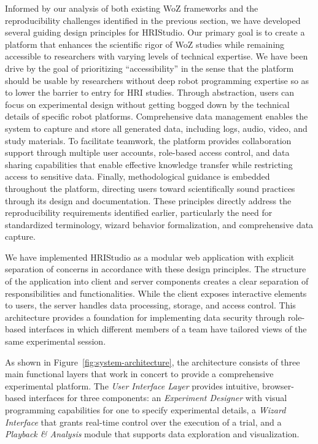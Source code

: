 \documentclass[letterpaper, 10 pt, conference]{subfiles/ieeeconf}
\begin{document}
Informed by our analysis of both existing WoZ frameworks and the reproducibility challenges identified in the previous section, we have developed several guiding design principles for HRIStudio. Our primary goal is to create a platform that enhances the scientific rigor of WoZ studies while remaining accessible to researchers with varying levels of technical expertise. We have been drive by the goal of prioritizing ``accessibility'' in the sense that the platform should be usable by researchers without deep robot programming expertise so as to lower the barrier to entry for HRI studies. Through abstraction, users can focus on experimental design without getting bogged down by the technical details of specific robot platforms. Comprehensive data management enables the system to capture and store all generated data, including logs, audio, video, and study materials. To facilitate teamwork, the platform provides collaboration support through multiple user accounts, role-based access control, and data sharing capabilities that enable effective knowledge transfer while restricting access to sensitive data. Finally, methodological guidance is embedded throughout the platform, directing users toward scientifically sound practices through its design and documentation. These principles directly address the reproducibility requirements identified earlier, particularly the need for standardized terminology, wizard behavior formalization, and comprehensive data capture. 

We have implemented HRIStudio as a modular web application with explicit separation of concerns in accordance with these design principles. The structure of the application into client and server components creates a clear separation of responsibilities and functionalities. While the client exposes interactive elements to users, the server handles data processing, storage, and access control. This architecture provides a foundation for implementing data security through role-based interfaces in which different members of a team have tailored views of the same experimental session.

As shown in Figure~\ref{fig:system-architecture}, the architecture consists of three main functional layers that work in concert to provide a comprehensive experimental platform. The \emph{User Interface Layer} provides intuitive, browser-based interfaces for three components: an \emph{Experiment Designer} with visual programming capabilities for one to specify experimental details, a \emph{Wizard Interface} that grants real-time control over the execution of a trial, and a \emph{Playback \& Analysis} module that supports data exploration and visualization.
\end{document}
